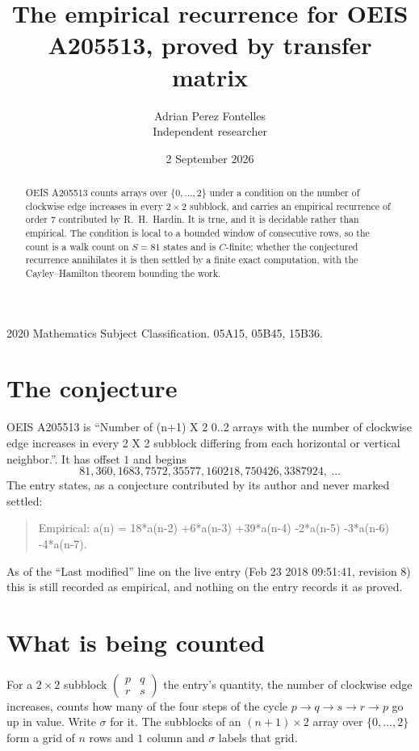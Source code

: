 \documentclass[11pt,a4paper]{article}
\title{The empirical recurrence for OEIS A205513, proved by transfer matrix}
\author{Adrian Perez Fontelles\\ \small Independent researcher}
\date{2 September 2026}
\theoremstyle{plain}
\theoremstyle{definition}
\begin{document}
\maketitle

\begin{abstract}
OEIS A205513 counts arrays over $\{0,\dots,2\}$ under a condition on the number of clockwise edge increases
in every $2\times2$ subblock, and carries an empirical recurrence of order $7$ contributed by
R.~H.~Hardin. It is true, and it is decidable rather than empirical. The condition is local to
a bounded window of consecutive rows, so the count is a walk count on $S=81$ states and is
$C$-finite; whether the conjectured recurrence annihilates it is then settled by a finite exact
computation, with the Cayley--Hamilton theorem bounding the work.
\end{abstract}

\noindent\small 2020 Mathematics Subject Classification. 05A15, 05B45, 15B36.\normalsize

\section{The conjecture}

OEIS A205513 is ``Number of (n+1) X 2 0..2 arrays with the number of clockwise edge increases in every 2 X 2 subblock differing from each horizontal or vertical neighbor.''. It has offset $1$ and begins
\[
81, 360, 1683, 7572, 35577, 160218, 750426, 3387924,\ \dots
\]
The entry states, as a conjecture contributed by its author and never marked settled:
\begin{quote}
Empirical: a(n) = 18*a(n-2) +6*a(n-3) +39*a(n-4) -2*a(n-5) -3*a(n-6) -4*a(n-7).
\end{quote}
As of the ``Last modified'' line on the live entry (Feb 23 2018 09:51:41, revision 8) this is still
recorded as empirical, and nothing on the entry records it as proved.

\section{What is being counted}

For a $2\times2$ subblock $\begin{pmatrix}p&q\\r&s\end{pmatrix}$ the
entry's quantity, the number of clockwise edge increases, counts how many of the four steps of the cycle $p\to q\to s\to r\to p$ go up in value. Write $\sigma$ for it. The subblocks of an
$(n+1)\times2$ array over $\{0,\dots,2\}$ form a grid of $n$ rows and $1$
column and $\sigma$ labels that grid.
\end{document}
